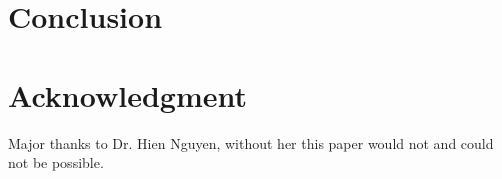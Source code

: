 \section{Conclusion}

\section{Acknowledgment}
Major thanks to Dr. Hien Nguyen, without her this paper would not and could not be possible.
